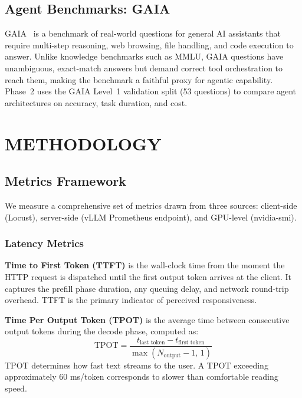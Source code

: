 \documentclass[a4paper,12pt]{report}
\begin{document}
\section{Agent Benchmarks: GAIA}

GAIA~\cite{gaia} is a benchmark of real-world questions for general AI assistants that require multi-step reasoning, web browsing, file handling, and code execution to answer. Unlike knowledge benchmarks such as MMLU, GAIA questions have unambiguous, exact-match answers but demand correct tool orchestration to reach them, making the benchmark a faithful proxy for agentic capability. Phase~2 uses the GAIA Level~1 validation split (53 questions) to compare agent architectures on accuracy, task duration, and cost.

\chapter{METHODOLOGY}

\section{Metrics Framework}

We measure a comprehensive set of metrics drawn from three sources: client-side (Locust), server-side (vLLM Prometheus endpoint), and GPU-level (nvidia-smi).

\subsection{Latency Metrics}

\textbf{Time to First Token (TTFT)} is the wall-clock time from the moment the HTTP request is dispatched until the first output token arrives at the client. It captures the prefill phase duration, any queuing delay, and network round-trip overhead. TTFT is the primary indicator of perceived responsiveness.

\textbf{Time Per Output Token (TPOT)} is the average time between consecutive output tokens during the decode phase, computed as:
\begin{equation}
\text{TPOT} = \frac{t_{\text{last token}} - t_{\text{first token}}}{\max(N_{\text{output}} - 1,\, 1)}
\end{equation}
TPOT determines how fast text streams to the user. A TPOT exceeding approximately 60 ms/token corresponds to slower than comfortable reading speed.
\end{document}
